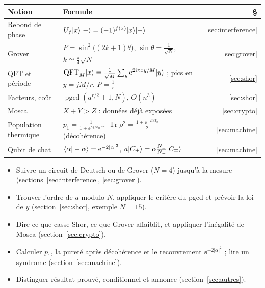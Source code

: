 \begin{center}
\renewcommand{\arraystretch}{1.12}
\small
\begin{tabular}{@{}l l r@{}}
\toprule
\textbf{Notion} & \textbf{Formule} & \textbf{§} \\
\midrule
Rebond de phase & $U_f|x\rangle|-\rangle=(-1)^{f(x)}|x\rangle|-\rangle$ & \ref{sec:interference} \\
Grover & $P=\sin^2\!\big((2k+1)\theta\big)$, \quad $\sin\theta=\frac{1}{\sqrt N}$, \quad $k\simeq\frac\pi4\sqrt N$ & \ref{sec:grover} \\
QFT et période & $\mathrm{QFT}_M|x\rangle=\frac{1}{\sqrt M}\sum_y\mathrm{e}^{2\mathrm{i}\pi xy/M}|y\rangle$ ; pics en $y=jM/r$, $P=\frac1r$ & \ref{sec:shor} \\
Facteurs, coût & $\operatorname{pgcd}(a^{r/2}\pm1,N)$, \quad $O(n^3)$ & \ref{sec:shor} \\
Mosca & $X+Y>Z$ : données déjà exposées & \ref{sec:crypto} \\
Population thermique & $p_1=\frac{1}{1+\ee^{hf/k_BT}}$, \quad $\operatorname{Tr}\rho^2=\frac{1+\ee^{-2t/T_2}}{2}$ (décohérence) & \ref{sec:machine} \\
Qubit de chat & $\langle \alpha|-\alpha\rangle=\mathrm{e}^{-2|\alpha|^2}$, \quad $a|C_\pm\rangle=\alpha\frac{N_\pm}{N_\mp}|C_\mp\rangle$ & \ref{sec:machine} \\
\bottomrule
\end{tabular}
\end{center}

\begin{savoirfaire}
\begin{itemize}[nosep]
  \item Suivre un circuit de Deutsch ou de Grover ($N=4$) jusqu'à la mesure (sections~\ref{sec:interference}, \ref{sec:grover}).
  \item Trouver l'ordre de $a$ modulo $N$, appliquer le critère du pgcd et prévoir la loi de $y$ (section~\ref{sec:shor}, exemple $N=15$).
  \item Dire ce que casse Shor, ce que Grover affaiblit, et appliquer l'inégalité de Mosca (section~\ref{sec:crypto}).
  \item Calculer $p_1$, la pureté après décohérence et le recouvrement $\ee^{-2|\alpha|^2}$ ; lire un syndrome (section~\ref{sec:machine}).
  \item Distinguer résultat prouvé, conditionnel et annonce (section~\ref{sec:autres}).
\end{itemize}
\end{savoirfaire}
